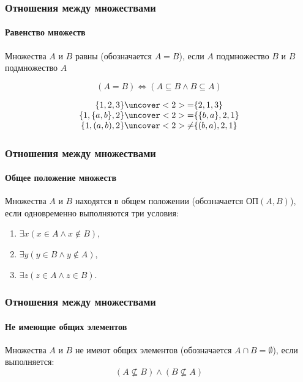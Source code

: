 \begin{frame}
    \frametitle{Отношения между множествами}
    \framesubtitle{Равенство множеств}
    
    \begin{definition}
        Множества $A$ и $B$ \alert{равны} (обозначается $A=B$), если $A$ подмножество $B$ и $B$ подмножество $A$
    \end{definition}
    
    \[(A=B)\Leftrightarrow(A\subseteq B\land B\subseteq A)\]
    
    \begin{example}
        \[
            \begin{array}{c}
                \{1,2,3\}\uncover<2>{=}\{2,1,3\}\\
                \{1,\{a,b\},2\}\uncover<2>{=}\{\{b,a\},2,1\}\\
                \{1,(a,b),2\}\uncover<2>{\neq}\{(b,a),2,1\}
            \end{array}
        \]
    \end{example}
\end{frame}

\begin{frame}
    \frametitle{Отношения между множествами}
    \framesubtitle{Общее положение множеств}
    
    \begin{definition}
        Множества $A$ и $B$ находятся в \alert{общем положении} (обозначается $\text{ОП}(A,B)$), если одновременно выполняются три условия:
        
        \begin{enumerate}
            \item $\exists x (x\in A \land  x\not\in B)$,
            \item $\exists y (y\in B \land  y\not\in A)$,
            \item $\exists z (z\in A \land  z\in B)$.
        \end{enumerate}
    \end{definition}
\end{frame}

\begin{frame}
    \frametitle{Отношения между множествами}
    \framesubtitle{Не имеющие общих элементов}
    
    \begin{definition}
        Множества $A$ и $B$ \alert{не имеют общих элементов} (обозначается $A\cap B=\emptyset$), если выполняется:
        \[
            (A\not\subseteq B)\land(B\not\subseteq A)
        \]
    \end{definition}
\end{frame}

